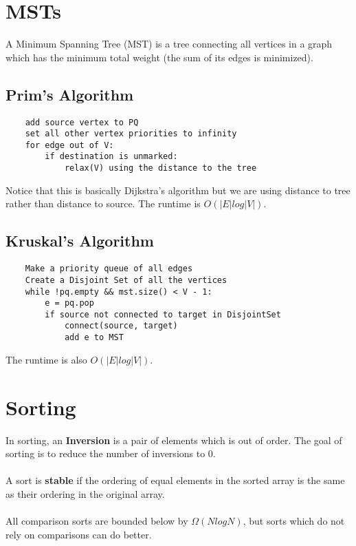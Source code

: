 \documentclass{article}
\begin{document}
\section{MSTs}
A Minimum Spanning Tree (MST) is a tree connecting all vertices in a graph which has the minimum total weight (the sum of its edges is minimized).
\subsection{Prim's Algorithm}
\begin{lstlisting}
    add source vertex to PQ
    set all other vertex priorities to infinity
    for edge out of V:
        if destination is unmarked:
            relax(V) using the distance to the tree
\end{lstlisting}
Notice that this is basically Dijkstra's algorithm but we are using distance to tree rather than distance to source.
The runtime is $O(|E|log|V|)$.
\subsection{Kruskal's Algorithm}
\begin{lstlisting}
    Make a priority queue of all edges
    Create a Disjoint Set of all the vertices
    while !pq.empty && mst.size() < V - 1:
        e = pq.pop
        if source not connected to target in DisjointSet
            connect(source, target)
            add e to MST
\end{lstlisting}
The runtime is also $O(|E|log|V|)$.
\section{Sorting}
In sorting, an \textbf{Inversion} is a pair of elements which is out of order.
The goal of sorting is to reduce the number of inversions to 0.\\\\
A sort is \textbf{stable} if the ordering of equal elements in the sorted array is the same as their ordering in the original array.
\\\\
All comparison sorts are bounded below by $\Omega(NlogN)$, but sorts which do not rely on comparisons can do better.
\end{document}
